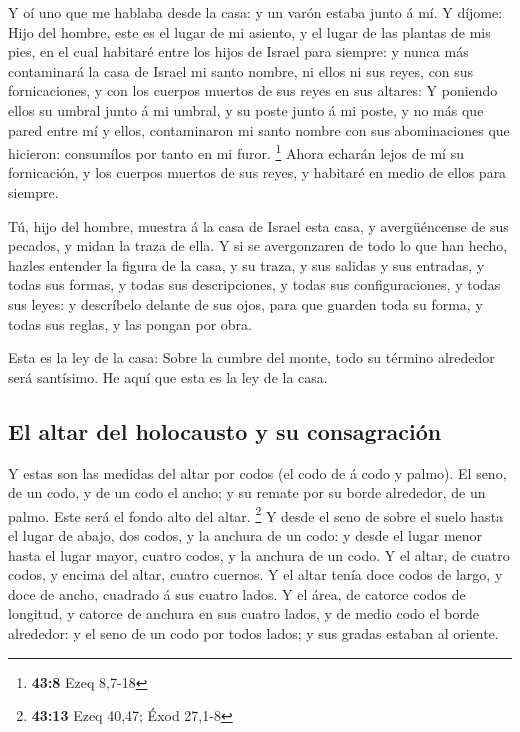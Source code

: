  Y oí uno que me hablaba desde la casa: y un varón estaba
junto á mí.  Y díjome: Hijo del hombre, este es el lugar de
mi asiento, y el lugar de las plantas de mis pies, en el cual habitaré
entre los hijos de Israel para siempre: y nunca más contaminará la casa
de Israel mi santo nombre, ni ellos ni sus reyes, con sus fornicaciones,
y con los cuerpos muertos de sus reyes en sus altares:  Y
poniendo ellos su umbral junto á mi umbral, y su poste junto á mi poste,
y no más que pared entre mí y ellos, contaminaron mi santo nombre con
sus abominaciones que hicieron: consumílos por tanto en mi furor.
\footnote{\textbf{43:8} Ezeq 8,7-18}  Ahora echarán lejos de
mí su fornicación, y los cuerpos muertos de sus reyes, y habitaré en
medio de ellos para siempre.

 Tú, hijo del hombre, muestra á la casa de Israel esta
casa, y avergüéncense de sus pecados, y midan la traza de ella.
 Y si se avergonzaren de todo lo que han hecho, hazles
entender la figura de la casa, y su traza, y sus salidas y sus entradas,
y todas sus formas, y todas sus descripciones, y todas sus
configuraciones, y todas sus leyes: y descríbelo delante de sus ojos,
para que guarden toda su forma, y todas sus reglas, y las pongan por
obra.

 Esta es la ley de la casa: Sobre la cumbre del monte, todo
su término alrededor será santísimo. He aquí que esta es la ley de la
casa.

\hypertarget{el-altar-del-holocausto-y-su-consagraciuxf3n}{%
\subsection{El altar del holocausto y su
consagración}\label{el-altar-del-holocausto-y-su-consagraciuxf3n}}

 Y estas son las medidas del altar por codos (el codo de á
codo y palmo). El seno, de un codo, y de un codo el ancho; y su remate
por su borde alrededor, de un palmo. Este será el fondo alto del altar.
\footnote{\textbf{43:13} Ezeq 40,47; Éxod 27,1-8}  Y desde
el seno de sobre el suelo hasta el lugar de abajo, dos codos, y la
anchura de un codo: y desde el lugar menor hasta el lugar mayor, cuatro
codos, y la anchura de un codo.  Y el altar, de cuatro
codos, y encima del altar, cuatro cuernos.  Y el altar
tenía doce codos de largo, y doce de ancho, cuadrado á sus cuatro lados.
 Y el área, de catorce codos de longitud, y catorce de
anchura en sus cuatro lados, y de medio codo el borde alrededor: y el
seno de un codo por todos lados; y sus gradas estaban al oriente.

